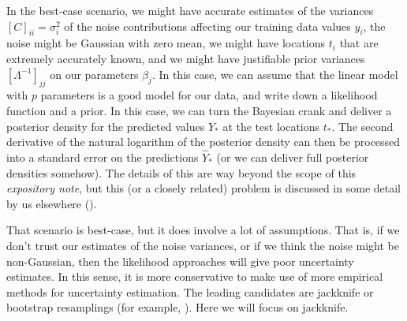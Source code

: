 \documentclass[12pt,letterpaper]{article}
\newcommand{\documentname}{\textsl{expository note}}
\begin{document}
In the best-case scenario, we might have accurate estimates of the variances $[C]_{ii} = \sigma_i^2$ of the noise contributions affecting our training data values $y_i$, the noise might be Gaussian with zero mean, we might have locations $t_i$ that are extremely accurately known, and we might have justifiable prior variances $[\Lambda^{-1}]_{jj}$ on our parameters $\beta_j$.
In this case, we can assume that the linear model with $p$ parameters is a good model for our data, and write down a likelihood function and a prior.
In this case, we can turn the Bayesian crank and deliver a posterior density for the predicted values $Y_\ast$ at the test locations $t_\ast$.
The second derivative of the natural logarithm of the posterior density can then be processed into a standard error on the predictions $\hat{Y}_\ast$ (or we can deliver full posterior densities somehow).
The details of this are way beyond the scope of this \documentname, but this (or a closely related) problem is discussed in some detail by us elsewhere (\citealt{products}).

That scenario is best-case, but it does involve a lot of assumptions.
That is, if we don't trust our estimates of the noise variances, or if we think the noise might be non-Gaussian, then the likelihood approaches will give poor uncertainty estimates.
In this sense, it is more conservative to make use of more empirical methods for uncertainty estimation.
The leading candidates are jackknife or bootstrap resamplings (for example, \citealt{bootjack}).
Here we will focus on jackknife.
\end{document}
